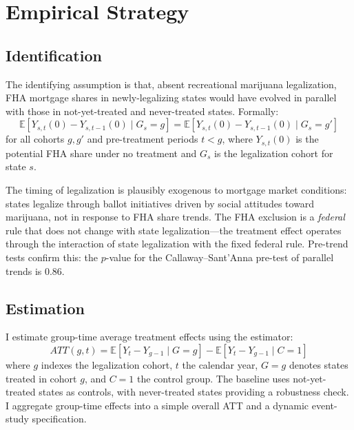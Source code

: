 \documentclass[12pt]{article}
\newcommand{\E}{\mathbb{E}}
\begin{document}


\section{Empirical Strategy}
\label{sec:strategy}

\subsection{Identification}

The identifying assumption is that, absent recreational marijuana legalization, FHA mortgage shares in newly-legalizing states would have evolved in parallel with those in not-yet-treated and never-treated states. Formally:
\begin{equation}
\E[Y_{s,t}(0) - Y_{s,t-1}(0) \mid G_s = g] = \E[Y_{s,t}(0) - Y_{s,t-1}(0) \mid G_s = g']
\end{equation}
for all cohorts $g, g'$ and pre-treatment periods $t < g$, where $Y_{s,t}(0)$ is the potential FHA share under no treatment and $G_s$ is the legalization cohort for state $s$.

The timing of legalization is plausibly exogenous to mortgage market conditions: states legalize through ballot initiatives driven by social attitudes toward marijuana, not in response to FHA share trends. The FHA exclusion is a \textit{federal} rule that does not change with state legalization---the treatment effect operates through the interaction of state legalization with the fixed federal rule. Pre-trend tests confirm this: the $p$-value for the Callaway--Sant'Anna pre-test of parallel trends is 0.86.

\subsection{Estimation}

I estimate group-time average treatment effects using the \citet{callaway2021} estimator:
\begin{equation}
ATT(g,t) = \E[Y_t - Y_{g-1} \mid G = g] - \E[Y_t - Y_{g-1} \mid C = 1]
\end{equation}
where $g$ indexes the legalization cohort, $t$ the calendar year, $G = g$ denotes states treated in cohort $g$, and $C = 1$ the control group. The baseline uses not-yet-treated states as controls, with never-treated states providing a robustness check. I aggregate group-time effects into a simple overall ATT and a dynamic event-study specification.
\end{document}
